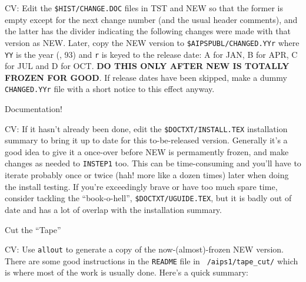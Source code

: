 \item{CV:} Edit the {\tt\$HIST/CHANGE.DOC} files in TST and NEW so that
	   the former is empty except for the next change number (and
	   the usual header comments), and the latter has the divider
	   indicating the following changes were made with that version
	   as NEW.  Later, copy the NEW version to
	   {\tt\$AIPS\-PUBL/CHAN\-GED.YYr} where {\tt YY} is the year
	   (\eg, 93) and {\tt r} is keyed to the release date: A for
	   JAN, B for APR, C for JUL and D for OCT.  {\bf DO THIS ONLY
	   AFTER NEW IS TOTALLY FROZEN FOR GOOD}.  If release dates have
	   been skipped, make a dummy {\tt CHANGED.YYr} file with a
	   short notice to this effect anyway.\medskip

\newsubsection Documentation!

\item{CV:} If it hasn't already been done, edit the
           {\tt\$DOCTXT/INSTALL.TEX} installation summary to bring it up
           to date for this to-be-released version.  Generally it's a
           good idea to give it a once-over before NEW is permamently
           frozen, and make changes as needed to {\tt INSTEP1} too.
           This can be time-consuming and you'll have to iterate
           probably once or twice (hah!  more like a dozen times) later
           when doing the install testing.  If you're exceedingly brave
           or have too much spare time, consider tackling the
           ``book-o-hell'', {\tt\$DOCTXT/UGUIDE.TEX}, but it is badly
           out of date and has a lot of overlap with the installation
           summary.

\newsubsection Cut the ``Tape''

\item{CV:} Use {\tt allout} to generate a copy of the
           now-(almost)-frozen NEW version.  There are some good
	   instructions in the {\tt README} file in {\tt
	   /aips1/tape\_cut/} which is where most of the work is usually
	   done.  Here's a quick summary:\medskip

